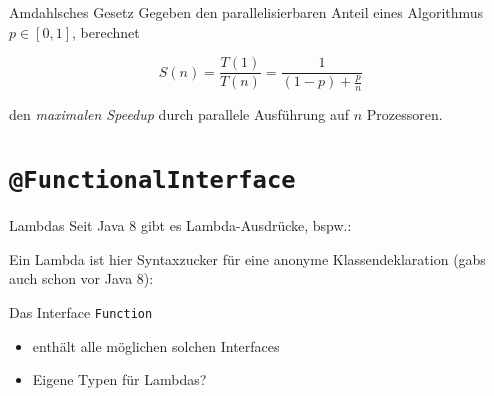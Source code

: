 \documentclass{beamer}
\newcommand{\code}[1]{
	\begin{mdframed}
		
	\end{mdframed}
}
\begin{document}
\begin{frame}{Amdahlsches Gesetz}
  Gegeben den parallelisierbaren Anteil eines Algorithmus $p \in [0, 1]$, berechnet

  \begin{equation*}
    S(n) = \frac{T(1)}{T(n)} = \frac{1}{(1 - p) + \frac{p}{n}}
  \end{equation*}

  den \emph{maximalen Speedup} durch parallele Ausführung auf $n$ Prozessoren.



\end{frame}

\section{\texttt{@FunctionalInterface}}

\begin{frame}{Lambdas}
  Seit Java 8 gibt es Lambda-Ausdrücke, bspw.:

  \code{code/funcinterface.java}

  Ein Lambda ist hier Syntaxzucker für eine anonyme Klassendeklaration (gabs auch schon vor Java 8):

  \code{code/anonymousclass.java}
\end{frame}

\begin{frame}{Das Interface \texttt{Function}}
  \code{code/function.java}

  \begin{itemize}
    \item {} enthält alle möglichen solchen Interfaces
    \item Eigene Typen für Lambdas?
  \end{itemize}
\end{frame}
\end{document}
